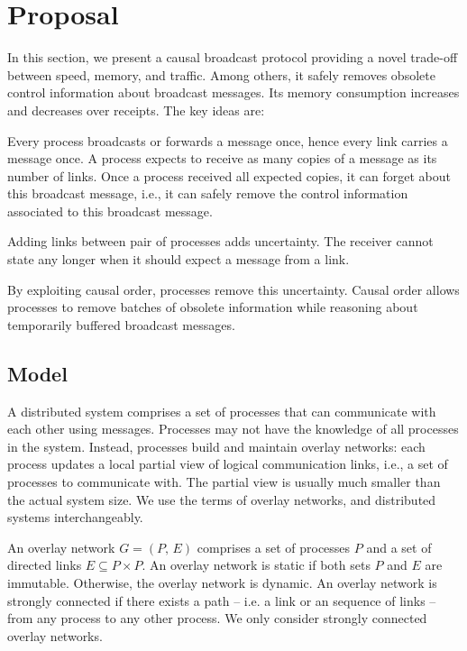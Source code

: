 
\section{Proposal}
\label{sec:proposal}

In this section, we present a causal broadcast protocol providing a novel
trade-off between speed, memory, and traffic. Among others, it safely removes
obsolete control information about broadcast messages.  Its memory consumption
increases and decreases over receipts. The key ideas are:
\begin{inparaenum}[(1)]
\item Every process broadcasts or forwards a message once, hence every link
  carries a message once. A process expects to receive as many copies of a
  message as its number of links. Once a process received all expected copies,
  it can forget about this broadcast message, i.e., it can safely remove the
  control information associated to this broadcast message.
\item Adding links between pair of processes adds uncertainty. The receiver
  cannot state any longer when it should expect a message from a link.
\item By exploiting causal order, processes remove this uncertainty. Causal
  order allows processes to remove batches of obsolete information while
  reasoning about temporarily buffered broadcast messages.
\end{inparaenum}

\subsection{Model}

A distributed system comprises a set of processes that can communicate with each
other using messages. Processes may not have the knowledge of all processes in
the system. Instead, processes build and maintain overlay networks: each process
updates a local partial view of logical communication links, i.e., a set of
processes to communicate with. The partial view is usually much smaller than the
actual system size. We use the terms of overlay networks, and distributed
systems interchangeably.

\begin{definition}
  An overlay network $G = (P,\, E)$ comprises a set of processes $P$ and a set
  of directed links $E \subseteq P \times P$.  An overlay network is static if
  both sets $P$ and $E$ are immutable. Otherwise, the overlay network is
  dynamic. An overlay network is strongly connected if there exists a path --
  i.e. a link or an sequence of links -- from any process to any other
  process. We only consider strongly connected overlay networks.
\end{definition}

